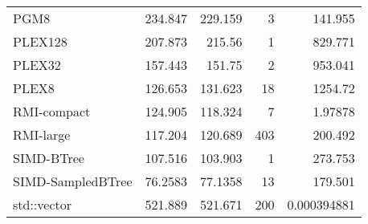 \begin{tabular}{lrrrr}
 PGM8              &               234.847  &              229.159  &            3 &   141.955       \\
 PLEX128           &               207.873  &              215.56   &            1 &   829.771       \\
 PLEX32            &               157.443  &              151.75   &            2 &   953.041       \\
 PLEX8             &               126.653  &              131.623  &           18 &  1254.72        \\
 RMI-compact       &               124.905  &              118.324  &            7 &     1.97878     \\
 RMI-large         &               117.204  &              120.689  &          403 &   200.492       \\
 SIMD-BTree        &               107.516  &              103.903  &            1 &   273.753       \\
 SIMD-SampledBTree &                76.2583 &               77.1358 &           13 &   179.501       \\
 std::vector       &               521.889  &              521.671  &          200 &     0.000394881 \\
\hline
\end{tabular}